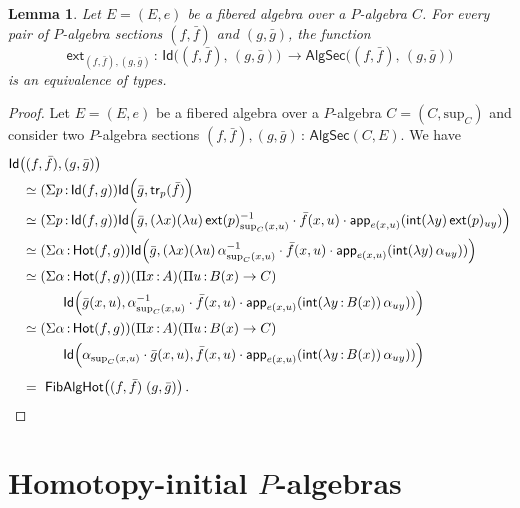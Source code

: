 \documentclass[10pt,a4paper,oneside,reqno]{amsart}
\numberwithin{equation}{section}
\theoremstyle{mythm}
\newtheorem{lemma}[theorem]{Lemma}
\theoremstyle{mydef}
\theoremstyle{myrmk}
\newcommand{\co}{\,{:}\,}
\newcommand{\ct}{\cdot}
\newcommand{\trans}{\mathsf{tr}}
\newcommand{\Hot}{\mathsf{Hot}}
\newcommand{\ext}{\mathsf{ext}}
\renewcommand{\int}{\mathsf{int}}
\newcommand{\Id}{\mathsf{Id}}
\newcommand{\app}{\mathsf{app}}
\renewcommand{\sup}{\mathrm{sup}}
\newcommand{\FibAlgHot}{\mathsf{FibAlgHot}}
\newcommand{\PalgSec}{\mathsf{AlgSec}}
\newcommand{\AlgSecHot}{\mathsf{AlgSec}}
\begin{document}
\begin{lemma}\label{lem:fibhomeqid} Let $E = (E, e)$ be a fibered algebra over a $P$-algebra $C$.
For every pair of $P$-algebra sections $(f, \bar{f})$ and $(g, \bar{g})$,  the function
\[
\ext_{(f, \bar{f}), (g, \bar{g})} \co \Id \big( (f, \bar{f}) ,\, (g, \bar{g}) \big) \, \to
\AlgSecHot\big( (f, \bar{f}) ,\, (g, \bar{g}) \big) 
\]
is an equivalence of types.
\end{lemma}

\begin{proof}Let $E = (E, e)$ be a fibered algebra over a $P$-algebra $C = (C, \sup_C)$ and consider two $P$-algebra
sections $(f,\bar{f}), (g,\bar{g}) \co \PalgSec(C,E)$. We have
\begin{align*}
 & \Id\big( (f,\bar{f}),  (g,\bar{g}) \big) \\ 
& \quad \simeq (\Sigma p \co \Id( f , g)) \Id \Big(\bar{g} , \trans_p ( \bar{f} ) \Big)  \\
& \quad \simeq (\Sigma p \co \Id( f , g))  \Id \Big(\bar{g}, 
(\lambda x)(\lambda u) \, \ext(p)_{\sup_C(x,u)}^{-1} \ct \bar{f}(x,u) \ct
 \app_{e(x,u)}(\int (\lambda y) \, \ext(p)_{u  y})  \Big)  \\
& \quad \simeq 
(\Sigma \alpha \co \Hot( f, g)) \Id \Big(\bar{g},  (\lambda x) (\lambda u) \, \alpha_{\sup_C(x,u)}^{-1} \ct \bar{f}(x,u) \ct 
\app_{e(x,u)} (\int (\lambda y)  \,  \alpha_{u y}))  \Big)  \\
&\quad \simeq (\Sigma \alpha \co \Hot( f, g)) (\Pi x \co A)(\Pi u \co B(x) \to C ) \\
 & \qquad \qquad \Id \Big(\bar{g}(x,u) , \alpha_{\sup_C(x,u)}^{-1} \ct \bar{f}(x,u) \ct \app_{e(x,u)}(\int (\lambda y \co B(x)) \, \alpha_{u  y})) \Big)  \\ 
& \quad \simeq (\Sigma \alpha \co \Hot( f, g)) (\Pi x \co A)(\Pi u \co B(x) \to C ) \\
& \qquad \qquad   \Id \Big(\alpha_{\sup_C(x,u)} \ct \bar{g}(x,u) , \bar{f}(x,u) \ct 
\app_{e(x,u)}(\int  (\lambda y \co B(x)) \,  \alpha_{u  y})) \Big) \\[1ex]
& \quad = \  \FibAlgHot \big( (f,\bar{f}) \; (g,\bar{g}) \big) \, . \qedhere
\end{align*}  
\end{proof}


 

\section{Homotopy-initial $P$-algebras}
\end{document}

